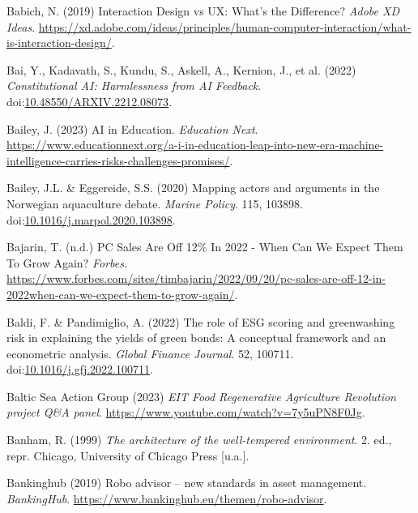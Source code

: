 \documentclass[
  letterpaper,
  DIV=11,
  numbers=noendperiod]{scrartcl}
\newlength{\cslhangindent}
\newenvironment{CSLReferences}[2] %
 {\begin{list}{}{%
  \setlength{\itemindent}{0pt}
  \setlength{\leftmargin}{0pt}
  \setlength{\parsep}{0pt}
  \ifodd #1
   \setlength{\leftmargin}{\cslhangindent}
   \setlength{\itemindent}{-1\cslhangindent}
  \fi
  \setlength{\itemsep}{#2\baselineskip}}}
 {\end{list}}
\begin{document}
\begin{CSLReferences}{0}{1}
Babich, N. (2019) Interaction {Design} vs {UX}: {What}'s the
{Difference}? \emph{Adobe XD Ideas}.
\url{https://xd.adobe.com/ideas/principles/human-computer-interaction/what-is-interaction-design/}.

Bai, Y., Kadavath, S., Kundu, S., Askell, A., Kernion, J., et al. (2022)
\emph{Constitutional {AI}: {Harmlessness} from {AI Feedback}}.
doi:\href{https://doi.org/10.48550/ARXIV.2212.08073}{10.48550/ARXIV.2212.08073}.

Bailey, J. (2023) {AI} in {Education}. \emph{Education Next}.
\url{https://www.educationnext.org/a-i-in-education-leap-into-new-era-machine-intelligence-carries-risks-challenges-promises/}.

Bailey, J.L. \& Eggereide, S.S. (2020) Mapping actors and arguments in
the {Norwegian} aquaculture debate. \emph{Marine Policy}. 115, 103898.
doi:\href{https://doi.org/10.1016/j.marpol.2020.103898}{10.1016/j.marpol.2020.103898}.

Bajarin, T. (n.d.) {PC Sales Are Off} 12\% {In} 2022 - {When Can We
Expect Them To Grow Again}? \emph{Forbes}.
\url{https://www.forbes.com/sites/timbajarin/2022/09/20/pc-sales-are-off-12-in-2022when-can-we-expect-them-to-grow-again/}.

Baldi, F. \& Pandimiglio, A. (2022) The role of {ESG} scoring and
greenwashing risk in explaining the yields of green bonds: {A}
conceptual framework and an econometric analysis. \emph{Global Finance
Journal}. 52, 100711.
doi:\href{https://doi.org/10.1016/j.gfj.2022.100711}{10.1016/j.gfj.2022.100711}.

Baltic Sea Action Group (2023) \emph{{EIT Food Regenerative Agriculture
Revolution} project {Q}\&{A} panel}.
\url{https://www.youtube.com/watch?v=7y5uPN8F0Jg}.

Banham, R. (1999) \emph{The architecture of the well-tempered
environment}. 2. ed., repr. Chicago, University of Chicago Press
{[}u.a.{]}.

Bankinghub (2019) Robo advisor -- new standards in asset management.
\emph{BankingHub}. \url{https://www.bankinghub.eu/themen/robo-advisor}.


\end{CSLReferences}
\end{document}
